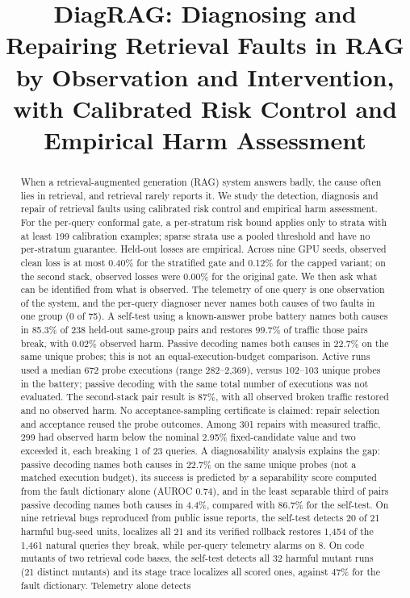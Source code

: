 \documentclass[conference]{IEEEtran}
\begin{document}
\title{DiagRAG: Diagnosing and Repairing Retrieval Faults in RAG by Observation and Intervention, with Calibrated Risk Control and Empirical Harm Assessment}

\author{
}

\maketitle

\begin{abstract}
When a retrieval-augmented generation (RAG) system answers badly, the cause often lies in retrieval, and retrieval rarely reports it. We study the detection, diagnosis and repair of retrieval faults using calibrated risk control and empirical harm assessment. For the per-query conformal gate, a per-stratum risk bound applies only to strata with at least 199 calibration examples; sparse strata use a pooled threshold and have no per-stratum guarantee. Held-out losses are empirical. Across nine GPU seeds, observed clean loss is at most 0.40\% for the stratified gate and 0.12\% for the capped variant; on the second stack, observed losses were 0.00\% for the original gate. We then ask what can be identified from what is observed. The telemetry of one query is one observation of the system, and the per-query diagnoser never names both causes of two faults in one group (0 of 75). A self-test using a known-answer probe battery names both causes in 85.3\% of 238 held-out same-group pairs and restores 99.7\% of traffic those pairs break, with 0.02\% observed harm. Passive decoding names both causes in 22.7\% on the same unique probes; this is not an equal-execution-budget comparison. Active runs used a median 672 probe executions (range 282--2{,}369), versus 102--103 unique probes in the battery; passive decoding with the same total number of executions was not evaluated. The second-stack pair result is 87\%, with all observed broken traffic restored and no observed harm. No acceptance-sampling certificate is claimed: repair selection and acceptance reused the probe outcomes. Among 301 repairs with measured traffic, 299 had observed harm below the nominal 2.95\% fixed-candidate value and two exceeded it, each breaking 1 of 23 queries. A diagnosability analysis explains the gap: passive decoding names both causes in 22.7\% on the same unique probes (not a matched execution budget), its success is predicted by a separability score computed from the fault dictionary alone (AUROC 0.74), and in the least separable third of pairs passive decoding names both causes in 4.4\%, compared with 86.7\% for the self-test. On nine retrieval bugs reproduced from public issue reports, the self-test detects 20 of 21 harmful bug-seed units, localizes all 21 and its verified rollback restores 1{,}454 of the 1{,}461 natural queries they break, while per-query telemetry alarms on 8. On code mutants of two retrieval code bases, the self-test detects all 32 harmful mutant runs (21 distinct mutants) and its stage trace localizes all scored ones, against 47\% for the fault dictionary. Telemetry alone detects 
\end{abstract}
\end{document}
